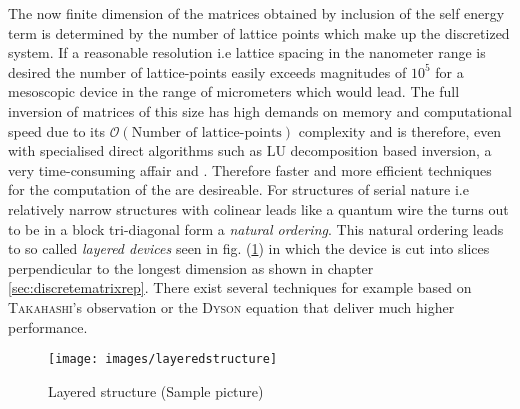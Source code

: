 The now finite dimension of the matrices obtained by inclusion of the self energy term is determined by the number of lattice points which make up the discretized system.
If a reasonable resolution i.e lattice spacing in the nanometer range is desired the number of lattice-points easily exceeds magnitudes of $10^5$ for a mesoscopic device in the range of micrometers which would lead. 
The full inversion of matrices of this size has high demands on memory and computational speed due to its $\mathcal{O}(\text{Number of lattice-points})$ complexity and is therefore, even with specialised direct algorithms such as LU decomposition based inversion, a very time-consuming affair\cite{Datta2000.2.53} and \cite{Li2009Thesis}.
Therefore faster and more efficient techniques for the computation of the \gfnc{} are desireable.
For structures of serial nature i.e relatively narrow structures with colinear leads like a quantum wire the \hamil{} turns out to be in a block tri-diagonal form a \emph{natural ordering}. This natural ordering leads to so called \emph{layered devices} seen in fig. (\ref{fig:layered}) in which the device is cut into slices perpendicular to the longest dimension as shown in chapter \ref{sec:discretematrixrep}. There exist several techniques for example based on \textsc{Takahashi}'s observation \cite{Takahashi1973} or the \textsc{Dyson} equation that deliver much higher performance.
\begin{figure}[h!]
\centering
\texttt{[image: images/layeredstructure]}
\caption{Layered structure (Sample picture)}
\label{fig:layered}
\end{figure}
